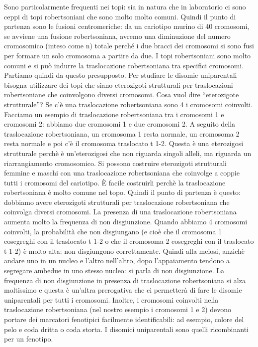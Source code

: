 \documentclass[11pt]{book}
\begin{document}
Sono particolarmente frequenti nei topi: sia in natura che in laboratorio ci sono ceppi di topi robertsoniani che sono molto molto comuni.
Quindi il punto di partenza sono le fusioni centromeriche: da un cariotipo murino di 40 cromosomi, se avviene una fusione robertsoniana, avremo una diminuzione del numero cromosomico (inteso come n) totale perché i due bracci dei cromosomi si sono fusi per formare un solo cromosoma a partire da due.
I topi robertsoniani sono molto comuni e si può indurre la traslocazione robertsoniana tra specifici cromosomi. Partiamo quindi da questo presupposto.
Per studiare le disomie uniparentali bisogna utilizzare dei topi che siano eterozigoti strutturali per traslocazioni robertsoniane che coinvolgono diversi cromosomi. 
Cosa vuol dire “eterozigote strutturale”? Se c’è una traslocazione robertsoniana sono 4 i cromosomi coinvolti. Facciamo un esempio di traslocazione robertsoniana tra i cromosomi 1 e  cromosomi 2: abbiamo due cromosomi 1 e due cromosomi 2. A seguito della traslocazione robertsoniana, un cromosoma 1 resta normale, un cromosoma 2 resta normale e poi c’è il cromosoma traslocato t 1-2. Questa è una eterozigosi strutturale perchè è un’eterozigosi che non riguarda singoli alleli, ma riguarda un riarrangiamento cromosomico.
Si possono costruire eterozigoti strutturali femmine e maschi con una traslocazione robertsoniana che coinvolge a coppie tutti i cromosomi del cariotipo. È facile costruirli perchè la traslocazione robertsoniana è molto comune nel topo.
Quindi il punto di partenza è questo: dobbiamo avere eterozigoti strutturali per traslocazione robertsoniana che coinvolga diversi cromosomi.
La presenza di una traslocazione robertsoniana aumenta molto la frequenza di non disgiunzione. Quando abbiamo 4 cromosomi coinvolti, la probabilità che non disgiungano (e cioè che il cromosoma 1 cosegreghi con il traslocato t 1-2 o che il cromosoma 2 cosegreghi con il traslocato t 1-2) è molto alta: non disgiungono correttamente. Quindi alla meiosi, anzichè andare uno in un nucleo e l’altro nell’altro, dopo l’appaiamento tendono a segregare ambedue in uno stesso nucleo: si parla di non disgiunzione. La frequenza di non disgiunzione in presenza di traslocazione robertsoniana si alza moltissimo e questa è un’altra prerogativa che ci permetterà di fare le disomie uniparentali per tutti i cromosomi.
Inoltre, i cromosomi coinvolti nella traslocazione robertsoniana (nel nostro esempio i cromosomi 1 e 2) devono portare dei marcatori fenotipici facilmente identificabili: ad esempio, colore del pelo e coda dritta o coda storta.
I disomici uniparentali sono quelli ricombinanti per un fenotipo.
\end{document}
